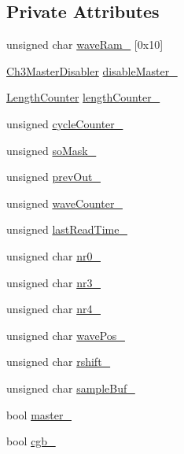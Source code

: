 \subsection*{Private Attributes}
\begin{DoxyCompactItemize}
\item 
unsigned char \hyperlink{classgambatte_1_1Channel3_adb49da0eed0e8e9fc7e7d67d88bf71f8}{wave\+Ram\+\_\+} \mbox{[}0x10\mbox{]}
\item 
\hyperlink{classgambatte_1_1Channel3_1_1Ch3MasterDisabler}{Ch3\+Master\+Disabler} \hyperlink{classgambatte_1_1Channel3_a449cc9afb7108dbecadfe2aee64eca7e}{disable\+Master\+\_\+}
\item 
\hyperlink{classgambatte_1_1LengthCounter}{Length\+Counter} \hyperlink{classgambatte_1_1Channel3_a2ea56b70d73fa7004bf5a4eb9b39538d}{length\+Counter\+\_\+}
\item 
unsigned \hyperlink{classgambatte_1_1Channel3_af06cab780d1d050d555889e0d3a44420}{cycle\+Counter\+\_\+}
\item 
unsigned \hyperlink{classgambatte_1_1Channel3_a4c5d31731f34309766d7b0e1267b45a0}{so\+Mask\+\_\+}
\item 
unsigned \hyperlink{classgambatte_1_1Channel3_a9cf0ee95ea065667f05600b1f5e49220}{prev\+Out\+\_\+}
\item 
unsigned \hyperlink{classgambatte_1_1Channel3_aeac32dfe75b7162668161acf3b50af34}{wave\+Counter\+\_\+}
\item 
unsigned \hyperlink{classgambatte_1_1Channel3_af4d0a88ee0abb8add35441c75963e29c}{last\+Read\+Time\+\_\+}
\item 
unsigned char \hyperlink{classgambatte_1_1Channel3_a7dc08776d608a4eeb23d0d121a3ea820}{nr0\+\_\+}
\item 
unsigned char \hyperlink{classgambatte_1_1Channel3_a253cc1dae94d72525c73015a5ca44f40}{nr3\+\_\+}
\item 
unsigned char \hyperlink{classgambatte_1_1Channel3_a7f60fafcf33ac8cc5bfe343f83695f07}{nr4\+\_\+}
\item 
unsigned char \hyperlink{classgambatte_1_1Channel3_a92f41b6ef5d3d3578e59597392db0eca}{wave\+Pos\+\_\+}
\item 
unsigned char \hyperlink{classgambatte_1_1Channel3_a043ba215cf9dfb925b26e231df26a77c}{rshift\+\_\+}
\item 
unsigned char \hyperlink{classgambatte_1_1Channel3_a958b59a4d8db55242588f76e0a7c7137}{sample\+Buf\+\_\+}
\item 
bool \hyperlink{classgambatte_1_1Channel3_aa4267f127e7aaa01a8cb8fcbd25d4f21}{master\+\_\+}
\item 
bool \hyperlink{classgambatte_1_1Channel3_a44558d0f698be5e911181a36b35d4e66}{cgb\+\_\+}
\end{DoxyCompactItemize}


